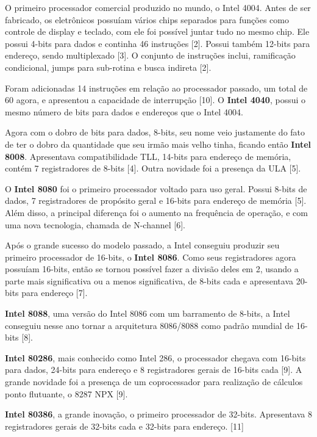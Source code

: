 \documentclass[12pt]{article}
\begin{document}
	O primeiro processador comercial produzido no mundo, o Intel 4004. Antes de ser fabricado, os eletrônicos possuíam vários chips separados para funções como controle de display e teclado, com ele foi possível juntar tudo no mesmo chip. Ele possui 4-bits para dados e continha 46 instruções [2]. Possui também 12-bits para endereço, sendo multiplexado [3]. O conjunto de instruções inclui, ramificação condicional, jumps para sub-rotina e busca indireta [2]. \
	
	Foram adicionadas 14 instruções em relação ao processador passado, um total de 60 agora, e apresentou a capacidade de interrupção [10]. O \textbf{Intel 4040}, possui o mesmo número de bits para dados e endereços que o Intel 4004. \
	
	Agora com o dobro de bits para dados, 8-bits, seu nome veio justamente do fato de ter o dobro da quantidade que seu irmão mais velho tinha, ficando então \textbf{Intel 8008}. Apresentava compatibilidade TLL, 14-bits para endereço de memória, contém 7 registradores de 8-bits [4]. Outra novidade foi a presença da ULA [5]. \
	
	O \textbf{Intel 8080} foi o primeiro processador voltado para uso geral. Possui 8-bits de dados, 7 registradores de propósito geral e 16-bits para endereço de memória [5]. Além disso, a principal diferença foi o aumento na frequência de operação, e com uma nova tecnologia, chamada de N-channel [6]. \
	
	Após o grande sucesso do modelo passado, a Intel conseguiu produzir seu primeiro processador de 16-bits, o \textbf{Intel 8086}. Como seus registradores agora possuíam 16-bits, então se tornou possível fazer a divisão deles em 2, usando a parte mais significativa ou a menos significativa, de 8-bits cada e apresentava 20-bits para endereço [7]. \
	
	 \textbf{Intel 8088}, uma versão do Intel 8086 com um barramento de 8-bits, a Intel conseguiu nesse ano tornar a arquitetura 8086/8088 como padrão mundial de 16-bits [8]. \
	 
	 \textbf{Intel 80286}, mais conhecido como Intel 286, o processador chegava com 16-bits para dados, 24-bits para endereço e 8 registradores gerais de 16-bits cada [9]. A grande novidade foi a presença de um coprocessador para realização de cálculos ponto flutuante, o 8287 NPX [9]. \
	 
	 \textbf{Intel 80386}, a grande inovação, o primeiro processador de 32-bits. Apresentava 8 registradores gerais de 32-bits cada e 32-bits para endereço. [11] \
	 
\end{document}
